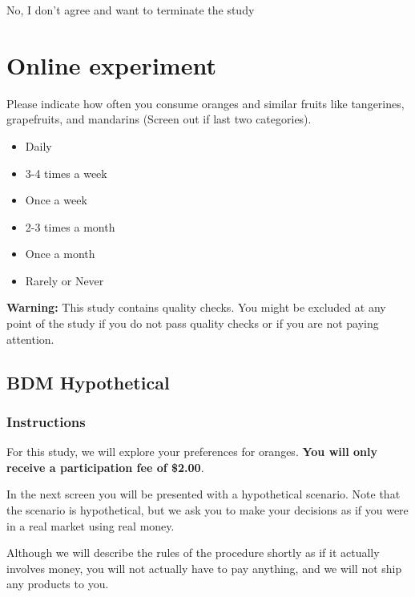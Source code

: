 \documentclass[12pt]{article}
\begin{document}
No, I don't agree and want to terminate the study

\section{Online experiment}

 Please indicate how often you consume oranges and similar fruits like tangerines, grapefruits, and mandarins (Screen out if last two categories).  

\begin{itemize}
    \item Daily
    \item 3-4 times a week
    \item Once a week
    \item 2-3 times a month
    \item Once a month
    \item Rarely or Never
\end{itemize}

\vspace{1cm} %

\textbf{Warning:} This study contains quality checks. You might be excluded at any point of the study if you do not pass quality checks or if you are not paying attention.


\clearpage


\subsection{BDM Hypothetical}

\subsubsection*{Instructions }


For this study, we will explore your preferences for oranges. \textbf{You will only receive a participation fee of \$2.00}. \par

 In the next screen you will be presented with a hypothetical scenario. Note that the scenario is hypothetical, but we ask you to make your decisions as if you were in a real market using real money. \par

Although we will describe the rules of the procedure shortly as if it actually involves money, you will not actually have to pay anything, and we will not ship any products to you. \par
\end{document}
